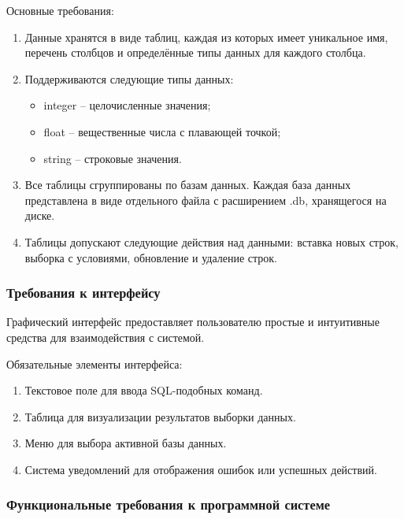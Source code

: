 Основные требования:
\begin{enumerate}
	\item Данные хранятся в виде таблиц, каждая из которых имеет уникальное имя, перечень столбцов и определённые типы данных для каждого столбца.
	\item Поддерживаются следующие типы данных:
	\begin{itemize}
		\item integer -- целочисленные значения;
		\item float -- вещественные числа с плавающей точкой; 
		\item string -- строковые значения.
	\end{itemize}
	\item Все таблицы сгруппированы по базам данных. Каждая база данных представлена в виде отдельного файла с расширением .db, хранящегося на диске.
	\item Таблицы допускают следующие действия над данными: вставка новых строк, выборка с условиями, обновление и удаление строк.
\end{enumerate}

\subsubsection{Требования к интерфейсу}

Графический интерфейс предоставляет пользователю простые и интуитивные средства для взаимодействия с системой.

Обязательные элементы интерфейса:
\begin{enumerate}
	\item Текстовое поле для ввода SQL-подобных команд.		
	\item Таблица для визуализации результатов выборки данных.	
	\item Меню для выбора активной базы данных.	
	\item Система уведомлений для отображения ошибок или успешных действий.
\end{enumerate}

\subsubsection{Функциональные требования к программной системе}

